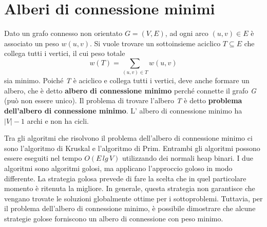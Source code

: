 \documentclass[10pt, a4paper]{report}
\begin{document}
\chapter{Alberi di connessione minimi}
Dato un grafo connesso non orientato $G = (V,E)$, ad ogni arco $(u,v) \in E$ è associato un peso $w(u,v)$. Si vuole trovare un sottoinsieme aciclico $T \subseteq E$ che collega tutti i vertici, il cui peso totale
\begin{equation*}
w(T) = \sum_{(u,v) \in T}w(u,v)
\end{equation*}
sia minimo. Poiché \textit{T} è aciclico e collega tutti i vertici, deve anche formare un albero, che è detto \textbf{albero di connessione minimo} perché connette il grafo \textit{G} (può non essere unico). Il problema di trovare l'albero \textit{T} è detto \textbf{problema dell'albero di connessione minimo}. L' albero di connessione minimo ha $|V| - 1$ archi e non ha cicli.

Tra gli algoritmi che risolvono il problema dell'albero di connessione minimo ci sono l'algoritmo di Kruskal e l'algoritmo di Prim. Entrambi gli algoritmi possono essere eseguiti nel tempo $O(E\,lg\,V)$ utilizzando dei normali heap binari. I due algoritmi sono algoritmi golosi, ma applicano l'approccio goloso in modo differente. La strategia golosa prevede di fare la scelta che in quel particolare momento è ritenuta la migliore. In generale, questa strategia non garantisce che vengano trovate le soluzioni globalmente ottime per i sottoproblemi. Tuttavia, per il problema dell'albero di connessione minimo, è possibile dimostrare che alcune strategie golose forniscono un albero di connessione con peso minimo.
\end{document}
